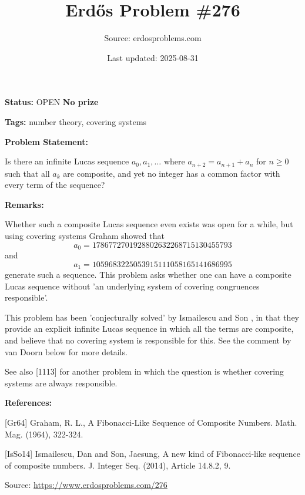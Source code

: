 \documentclass{article}
\title{Erd\H{o}s Problem \#276}
\date{Last updated: 2025-08-31}
\author{Source: erdosproblems.com}
\begin{document}
\maketitle

\noindent\textbf{Status:} OPEN \quad \textbf{No prize}

\noindent\textbf{Tags:} number theory, covering systems

\medskip
\noindent\textbf{Problem Statement:}

Is there an infinite Lucas sequence $a_0,a_1,\ldots$ where $a_{n+2}=a_{n+1}+a_n$ for $n\geq 0$ such that all $a_k$ are composite, and yet no integer has a common factor with every term of the sequence?

\bigskip
\noindent\textbf{Remarks:}

Whether such a composite Lucas sequence even exists was open for a while, but using covering systems Graham \cite{Gr64} showed that\[a_0 = 1786772701928802632268715130455793\]and\[a_1 = 1059683225053915111058165141686995\]generate such a sequence. This problem asks whether one can have a composite Lucas sequence without 'an underlying system of covering congruences responsible'. 

This problem has been 'conjecturally solved' by Ismailescu and Son \cite{IsSo14}, in that they provide an explicit infinite Lucas sequence in which all the terms are composite, and believe that no covering system is responsible for this. See the comment by van Doorn below for more details.

See also [1113] for another problem in which the question is whether covering systems are always responsible.

\bigskip
\noindent\textbf{References:}

[Gr64] Graham, R. L., A Fibonacci-Like Sequence of Composite Numbers. Math. Mag. (1964), 322-324.
 
 [IsSo14] Ismailescu, Dan and Son, Jaesung, A new kind of {F}ibonacci-like sequence of composite numbers. J. Integer Seq. (2014), Article 14.8.2, 9.

\bigskip
\noindent\small{Source: \url{https://www.erdosproblems.com/276}}
\end{document}
